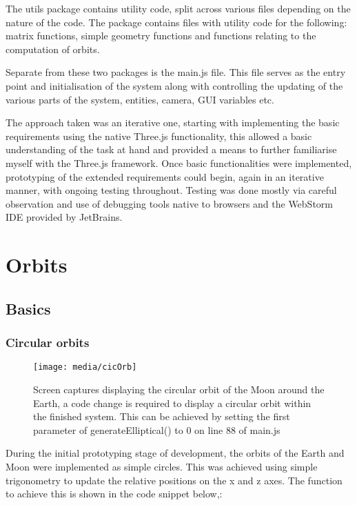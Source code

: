 \documentclass[titlepage]{article}
\begin{document}
The utils package contains utility code, split across various files depending on the nature of the code. The package contains files with utility code for the following: matrix functions, simple geometry functions and functions relating to the computation of orbits.


Separate from these two packages is the main.js file. This file serves as the entry point and initialisation of the system along with controlling the updating of the various parts of the system, entities, camera, GUI variables etc. 


The approach taken was an iterative one, starting with implementing the basic requirements using the native Three.js functionality, this allowed a basic understanding of the task at hand and provided a means to further familiarise myself with the Three.js framework. Once basic functionalities were implemented, prototyping of the extended requirements could begin, again in an iterative manner, with ongoing testing throughout. Testing was done mostly via careful observation and use of debugging tools native to browsers and the WebStorm IDE provided by JetBrains.


\section{Orbits}

\subsection{Basics}
\subsubsection{Circular orbits}
\begin{figure}[h!]
                \centering
                \texttt{[image: media/cicOrb]}
                \caption{Screen captures displaying the circular orbit of the Moon around the Earth, a code change is required to display a circular orbit within the finished system. This can be achieved by setting the first parameter of generateElliptical() to 0 on line 88 of main.js }
            \end{figure}
During the initial prototyping stage of development, the orbits of the Earth and Moon were implemented as simple circles. This was achieved using simple trigonometry to update the relative positions on the x and z axes. The function to achieve this is shown in the code snippet below,:
\end{document}
